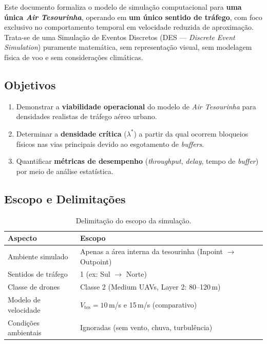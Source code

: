 \documentclass[12pt,a4paper]{article}
\begin{document}
Este documento formaliza o modelo de simulação computacional para \textbf{uma única \textit{Air Tesourinha}}, operando em \textbf{um único sentido de tráfego}, com foco exclusivo no comportamento temporal em velocidade reduzida de aproximação. Trata-se de uma Simulação de Eventos Discretos (DES --- \textit{Discrete Event Simulation}) puramente matemática, sem representação visual, sem modelagem física de voo e sem considerações climáticas.

\subsection{Objetivos}

\begin{enumerate}
    \item Demonstrar a \textbf{viabilidade operacional} do modelo de \textit{Air Tesourinha} para densidades realistas de tráfego aéreo urbano.
    \item Determinar a \textbf{densidade crítica} ($\lambda^*$) a partir da qual ocorrem bloqueios físicos nas vias principais devido ao esgotamento de \textit{buffers}.
    \item Quantificar \textbf{métricas de desempenho} (\textit{throughput}, \textit{delay}, tempo de \textit{buffer}) por meio de análise estatística.
\end{enumerate}

\subsection{Escopo e Delimitações}

\begin{table}[H]
\centering
\caption{Delimitação do escopo da simulação.}
\label{tab:escopo}
\begin{tabular}{@{}ll@{}}
\toprule
\textbf{Aspecto} & \textbf{Escopo} \\
\midrule
Ambiente simulado     & Apenas a área interna da tesourinha (Inpoint $\to$ Outpoint) \\
Sentidos de tráfego   & 1 (ex: Sul $\to$ Norte) \\
Classe de drones      & Classe 2 (Medium UAVs, Layer 2: 80--120\,m) \\
Modelo de velocidade  & $V_{\text{tes}} = 10$\,m/s e 15\,m/s (comparativo) \\
Condições ambientais  & Ignoradas (sem vento, chuva, turbulência) \\
\bottomrule
\end{tabular}
\end{table}
\end{document}
